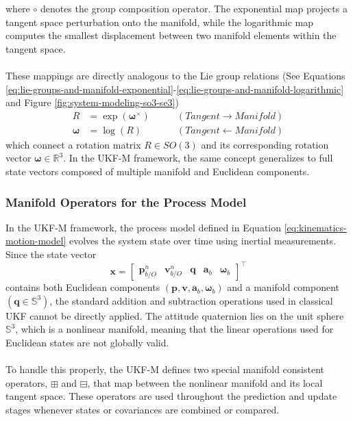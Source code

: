 where $\circ$ denotes the group composition operator. The exponential map projects a tangent space perturbation onto the manifold, while the logarithmic map computes the smallest displacement between two manifold elements within the tangent space.  
\\ \\
These mappings are directly analogous to the Lie group relations (See Equations \ref{eq:lie-groups-and-manifold-exponential}-\ref{eq:lie-groups-and-manifold-logarithmic} and Figure \ref{fig:system-modeling-so3-se3})
$$
\begin{aligned}
    R &= \exp(\boldsymbol{\omega}^\times) &\qquad (Tangent \rightarrow Manifold) \\
    \boldsymbol{\omega} &= \log(R) &\qquad (Tangent \leftarrow Manifold)
\end{aligned}
$$
which connect a rotation matrix $R \in SO(3)$ and its corresponding rotation vector $\boldsymbol{\omega} \in \mathbb{R}^3$. In the UKF-M framework, the same concept generalizes to full state vectors composed of multiple manifold and Euclidean components.



\subsubsection{Manifold Operators for the Process Model}
In the UKF-M framework, the process model defined in Equation \ref{eq:kinematics-motion-model} evolves the system state over time using inertial measurements. Since the state vector
$$
    \mathbf{x} =
    \begin{bmatrix}
        \mathbf{p}_{b/O}^{n} & \mathbf{v}_{b/O}^{n} & \mathbf{q} & \mathbf{a}_b & \mathbf{\omega}_b
    \end{bmatrix}^\top
$$
contains both Euclidean components $(\mathbf{p}, \mathbf{v}, \mathbf{a}_b, \mathbf{\omega}_b)$ and a manifold component $(\mathbf{q} \in \mathbb{S}^3)$, the standard addition and subtraction operations used in classical UKF cannot be directly applied. The attitude quaternion lies on the unit sphere $\mathbb{S}^3$, which is a nonlinear manifold, meaning that the linear operations used for Euclidean states are not globally valid.  
\\ \\
To handle this properly, the UKF-M defines two special manifold consistent operators, $\boxplus$ and $\boxminus$, that map between the nonlinear manifold and its local tangent space. These operators are used throughout the prediction and update stages whenever states or covariances are combined or compared.

